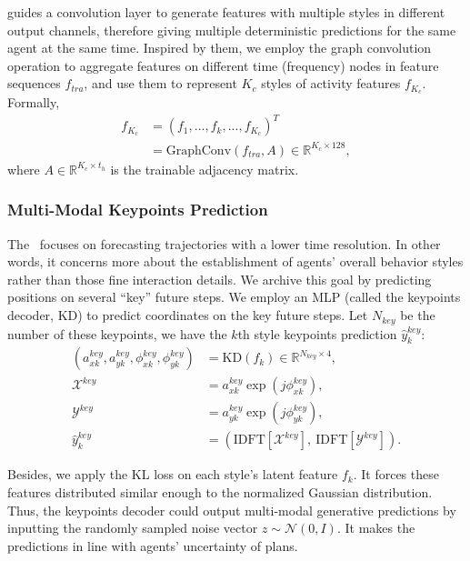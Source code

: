 \documentclass[../paper.tex]{subfiles}
\begin{document}
\cite{wong2021msn} guides a convolution layer to generate features with multiple styles in different output channels, therefore giving multiple deterministic predictions for the same agent at the same time.
Inspired by them, we employ the graph convolution operation to aggregate features on different time (frequency) nodes in feature sequences $f_{tra}$, and use them to represent $K_c$ styles of activity features $f_{K_c}$.
Formally,
\begin{equation}
    \begin{aligned}
        f_{K_c} &= (f_1, ..., f_k, ..., f_{K_c})^T \\
        &= \mbox{GraphConv}(f_{tra}, A) \in \mathbb{R}^{K_c \times 128},
    \end{aligned}
\end{equation}
where $A \in \mathbb{R}^{K_c \times t_h}$ is the trainable adjacency matrix.

\subsubsection{Multi-Modal Keypoints Prediction}

The \ALPHAMODEL~focuses on forecasting trajectories with a lower time resolution.
In other words, it concerns more about the establishment of agents' overall behavior styles rather than those fine interaction details.
We archive this goal by predicting positions on several ``key'' future steps.
We employ an MLP (called the keypoints decoder, KD) to predict coordinates on the key future steps.
Let $N_{key}$ be the number of these keypoints, we have the $k$th style keypoints prediction $\hat{y}_k^{key}$:
\begin{equation}
    \label{eq_keypointsprediction}
    \begin{aligned}
        (a_{xk}^{key}, a_{yk}^{key}, \phi_{xk}^{key}, \phi_{yk}^{key}) &= \mbox{KD}(f_k) \in \mathbb{R}^{N_{key} \times 4}, \\
        \mathcal{X}^{key} &= a_{xk}^{key} \exp(j\phi_{xk}^{key}), \\
        \mathcal{Y}^{key} &= a_{yk}^{key} \exp(j\phi_{yk}^{key}), \\
        \hat{y}_k^{key} &= \left(\mbox{IDFT}[\mathcal{X}^{key}],~\mbox{IDFT}[\mathcal{Y}^{key}]\right).
    \end{aligned}
\end{equation}

Besides, we apply the KL loss on each style's latent feature $f_k$.
It forces these features distributed similar enough to the normalized Gaussian distribution.
Thus, the keypoints decoder could output multi-modal generative predictions by inputting the randomly sampled noise vector $z \sim \mathcal{N}(0, I)$.
It makes the predictions in line with agents' uncertainty of plans.
\end{document}
